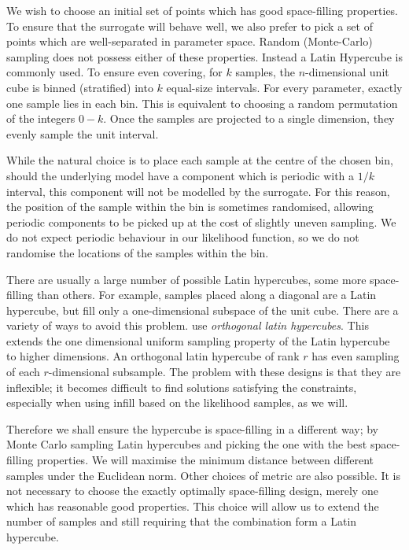 \documentclass[10pt, aps, prd]{revtex4-1}
\begin{document}
We wish to choose an initial set of points which has good space-filling properties. To ensure that the surrogate will behave well, 
we also prefer to pick a set of points which are well-separated in parameter space. Random (Monte-Carlo) sampling does not 
possess either of these properties. Instead a Latin Hypercube is commonly used. To ensure even covering, for $k$ samples, 
the $n$-dimensional unit cube is binned (stratified) into $k$ equal-size intervals. For every parameter, exactly one sample 
lies in each bin. This is equivalent to choosing a random permutation of the integers $0-k$. Once the samples are projected to 
a single dimension, they evenly sample the unit interval.

While the natural choice is to place each sample at the centre of the chosen bin, should the underlying model have a component 
which is periodic with a $1/k$ interval, this component will not be modelled by the surrogate. For this reason, the position 
of the sample within the bin is sometimes randomised, allowing periodic components to be picked up at the cost of slightly 
uneven sampling. We do not expect periodic behaviour in our likelihood function, so we do not randomise the locations of 
the samples within the bin.

There are usually a large number of possible Latin hypercubes, some more space-filling than others. %
For example, samples placed along a diagonal are a Latin hypercube, but fill only a one-dimensional subspace of the unit cube. There are a 
variety of ways to avoid this problem. \cite{Heitmann:2009} use \textit{orthogonal latin hypercubes}. This extends the 
one dimensional uniform sampling property of the Latin hypercube to higher dimensions. An orthogonal latin hypercube of rank $r$
has even sampling of each $r$-dimensional subsample. The problem with these designs is that they are inflexible; it becomes difficult
to find solutions satisfying the constraints, especially when using infill based on the likelihood samples, as we will.

Therefore we shall ensure the hypercube is space-filling in a different way; by Monte Carlo sampling Latin hypercubes and 
picking the one with the best space-filling properties. We will maximise the minimum distance between different samples
under the Euclidean norm. Other choices of metric are also possible. It is not necessary to choose the exactly optimally space-filling 
design, merely one which has reasonable good properties. This choice will allow us to extend the number of samples 
and still requiring that the combination form a Latin hypercube.
\end{document}
